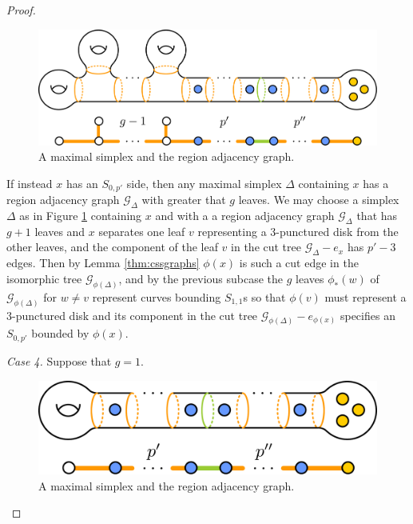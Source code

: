 \begin{proof}
    \begin{figure}[h!]
      \centering
      \includegraphics[width=.8\textwidth]{figures/cssmaxsimp2.pdf}
      \caption{A maximal simplex and the region adjacency graph.}
      \label{fig:cssmaxsimp2}
    \end{figure}

    If instead $x$ has an $S_{0,p'}$ side,
    then any maximal simplex $\Delta$ containing $x$ has a region adjacency graph $\mathcal G_\Delta$
    with greater that $g$ leaves.
    We may choose a simplex $\Delta$ as in Figure \ref{fig:cssmaxsimp2} containing $x$ and with a a region adjacency graph $\mathcal G_\Delta$
    that has $g+1$ leaves and $x$ separates one leaf $v$ representing a 3-punctured disk from the other leaves,
    and the component of the leaf $v$ in the cut tree $\mathcal G_\Delta - e_x$ has $p'-3$ edges.
    Then by Lemma \ref{thm:cssgraphs} $\phi(x)$ is such a cut edge in the isomorphic tree $\mathcal G_{\phi(\Delta)}$, and
    by the previous subcase the  $g$ leaves $\phi_\ast(w)$ of $\mathcal G_{\phi(\Delta)}$ for $w\neq v$
    represent curves bounding $S_{1,1}$s so that $\phi(v)$ must represent a 3-punctured disk and its component in
    the cut tree $\mathcal G_{\phi(\Delta)} - e_{\phi(x)}$ specifies an $S_{0,p'}$ bounded by $\phi(x)$.

    \emph{Case 4.}  Suppose that $g=1$.

    \begin{figure}[h!]
      \centering
      \includegraphics[width=.6\textwidth]{figures/cssmaxsimp3.pdf}
      \caption{A maximal simplex and the region adjacency graph.}
      \label{fig:cssmaxsimp3}
    \end{figure}


\end{proof}

